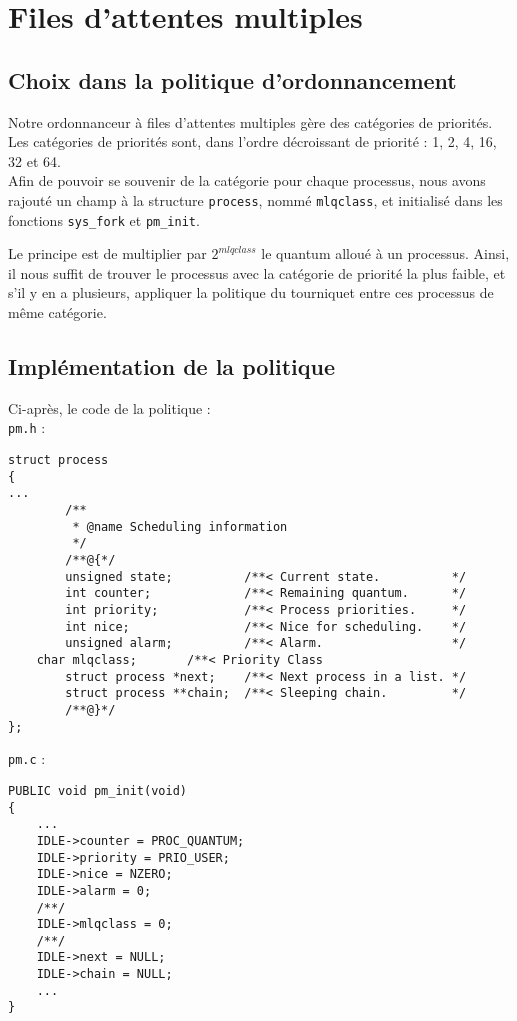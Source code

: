 \section{Files d'attentes multiples}

\subsection{Choix dans la politique d'ordonnancement}

Notre ordonnanceur à files d'attentes multiples gère des catégories de priorités.
Les catégories de priorités sont, dans l'ordre décroissant de priorité : 1, 2, 4, 16, 32 et 64.
\\

Afin de pouvoir se souvenir de la catégorie pour chaque processus, nous avons rajouté un champ à la structure \texttt{process}, nommé \texttt{mlqclass}, et initialisé dans les fonctions \texttt{sys\_fork} et \texttt{pm\_init}.

Le principe est de multiplier par $2^{mlqclass}$ le quantum alloué à un processus.
Ainsi, il nous suffit de trouver le processus avec la catégorie de priorité la plus faible, et s'il y en a plusieurs, appliquer la politique du tourniquet entre ces processus de même catégorie.

\subsection{Implémentation de la politique}

Ci-après, le code de la politique :
\\

\texttt{pm.h} :

\begin{lstlisting}
struct process
{
...
    	/**
    	 * @name Scheduling information
    	 */
		/**@{*/
    	unsigned state;          /**< Current state.          */
    	int counter;             /**< Remaining quantum.      */
    	int priority;            /**< Process priorities.     */
    	int nice;                /**< Nice for scheduling.    */
    	unsigned alarm;          /**< Alarm.                  */
	char mlqclass;		 /**< Priority Class
		struct process *next;    /**< Next process in a list. */
		struct process **chain;  /**< Sleeping chain.         */
		/**@}*/
};
\end{lstlisting}

\texttt{pm.c} :

\begin{lstlisting}
PUBLIC void pm_init(void)
{
	...
	IDLE->counter = PROC_QUANTUM;
	IDLE->priority = PRIO_USER;
	IDLE->nice = NZERO;
	IDLE->alarm = 0;
	/**/
	IDLE->mlqclass = 0;
	/**/
	IDLE->next = NULL;
	IDLE->chain = NULL;
	...
}
\end{lstlisting}

